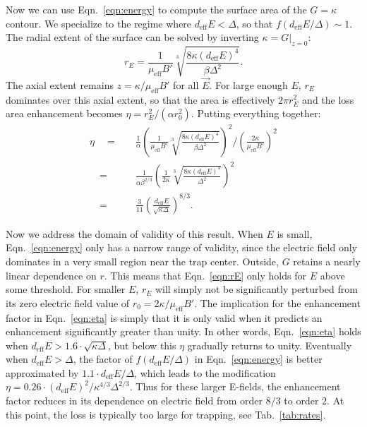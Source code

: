 \documentclass[defaultstyle,11pt]{thesis}
\begin{document}
Now we can use Eqn.~\ref{eqn:energy} to compute the surface area of the $G=\kappa$ contour.
We specialize to the regime where $d_\text{eff}E<\Delta$, so that $f(d_\text{eff}E/\Delta)\sim 1$.
The radial extent of the surface can be solved by inverting $\kappa=G|_{z=0}$:
\begin{equation}
\label{eqn:rE}
r_E = \frac{1}{\mu_\text{eff}B'}\sqrt[3]{\frac{8\kappa(d_\text{eff}E)^4}{\beta\Delta^2}}.
\end{equation}
The axial extent remains $z=\kappa/\mu_\text{eff}B'$ for all $\vec{E}$.
For large enough $E$, $r_E$ dominates over this axial extent, so that the area is effectively $2\pi r_E^2$ and the loss area enhancement becomes $\eta = r_E^2/(\alpha r_0^2)$.
Putting everything together:
\begin{equation}
\begin{split}
\label{eqn:eta}
\eta\quad =&\quad \frac{1}{\alpha}\left(\frac{1}{\mu_\text{eff}B'}\sqrt[3]{\frac{8\kappa(d_\text{eff}E)^4}{\beta\Delta^2}}\right)^2\bigg/\left(\frac{2\kappa}{\mu_\text{eff}B'}\right)^2\\
\quad=&\quad \frac{1}{\alpha\beta^{2/3}}\left(\frac{1}{2\kappa}\sqrt[3]{\frac{8\kappa(d_\text{eff}E)^4}{\Delta^2}}\right)^2\\
\quad=&\quad\frac{3}{11}\left(\frac{d_\text{eff}E}{\sqrt{\kappa\Delta}}\right)^{8/3}.
\end{split}
\end{equation}

Now we address the domain of validity of this result.
When $E$ is small, Eqn.~\ref{eqn:energy} only has a narrow range of validity, since the electric field only dominates in a very small region near the trap center.
Outside, $G$ retains a nearly linear dependence on $r$.
This means that Eqn.~\ref{eqn:rE} only holds for $E$ above some threshold.
For smaller $E$, $r_E$ will simply not be significantly perturbed from its zero electric field value of $r_0=2\kappa/\mu_\text{eff}B'$.
The implication for the enhancement factor in Eqn.~\ref{eqn:eta} is simply that it is only valid when it predicts an enhancement significantly greater than unity.
In other words, Eqn.~\ref{eqn:eta} holds when $d_\text{eff}E>1.6\!\cdot\!\sqrt{\kappa\Delta}$, but below this $\eta$ gradually returns to unity.
Eventually when $d_\text{eff}E>\Delta$, the factor of $f(d_\text{eff}E/\Delta)$ in Eqn.~\ref{eqn:energy} is better approximated by $1.1\!\cdot\!d_\text{eff}E/\Delta$, which leads to the modification $\eta=0.26\!\cdot\!(d_\text{eff}E)^2/\kappa^{4/3}\Delta^{2/3}$.
Thus for these larger E-fields, the enhancement factor reduces in its dependence on electric field from order $8/3$ to order $2$.
At this point, the loss is typically too large for trapping, see Tab.~\ref{tab:rates}.
\end{document}
